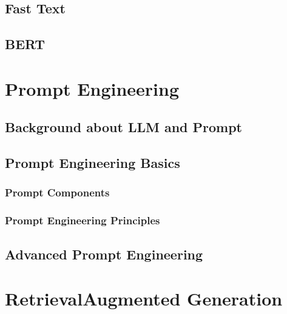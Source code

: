 \documentclass[letterpaper,11pt,english]{sphinxmanual}
\begin{document}
\section{Fast Text}
\label{\detokenize{embedding:fast-text}}

\section{BERT}
\label{\detokenize{embedding:bert}}
\sphinxstepscope


\chapter{Prompt Engineering}
\label{\detokenize{prompt:prompt-engineering}}\label{\detokenize{prompt:prompt}}\label{\detokenize{prompt::doc}}

\section{Background about LLM and Prompt}
\label{\detokenize{prompt:background-about-llm-and-prompt}}

\section{Prompt Engineering Basics}
\label{\detokenize{prompt:prompt-engineering-basics}}

\subsection{Prompt Components}
\label{\detokenize{prompt:prompt-components}}

\subsection{Prompt Engineering Principles}
\label{\detokenize{prompt:prompt-engineering-principles}}

\section{Advanced Prompt Engineering}
\label{\detokenize{prompt:advanced-prompt-engineering}}
\sphinxstepscope


\chapter{Retrieval\sphinxhyphen{}Augmented Generation}
\label{\detokenize{rag:retrieval-augmented-generation}}\label{\detokenize{rag:rag}}\label{\detokenize{rag::doc}}
\end{document}
